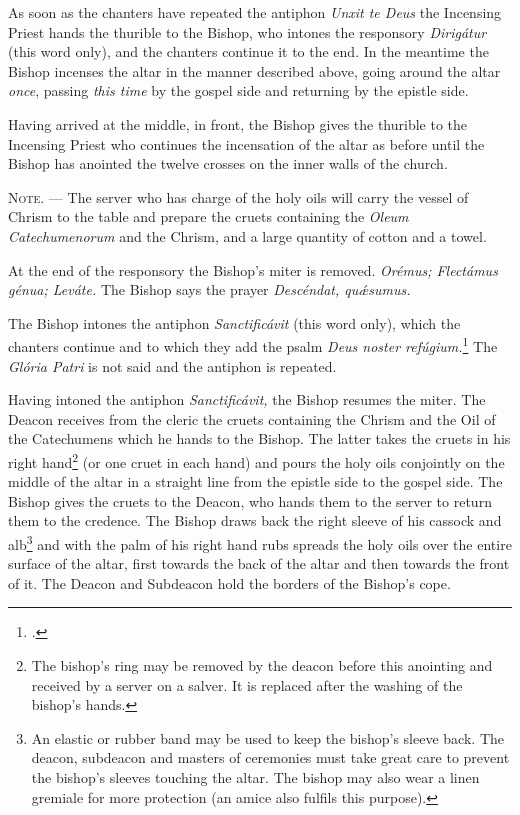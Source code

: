 \documentclass[letterpaper]{report}
\begin{document}
{    As soon as the chanters have repeated the antiphon \textit{Unxit te Deus}
    the Incensing Priest hands the thurible to the Bishop, who intones the
    responsory \textit{Dirig\'atur} (this word only), and the chanters continue
    it to the end. In the meantime the Bishop incenses the altar in the manner
    described above, going around the altar \textit{once}, passing \textit{this
    time} by the gospel side and returning by the epistle side.

    \rubric Having arrived at the middle, in front, the Bishop gives the
    thurible to the Incensing Priest who continues the incensation of the altar
    as before until the Bishop has anointed the twelve crosses on the inner
    walls of the church.

    \textsc{Note. ---} The server who has charge of the holy oils will carry
    the vessel of Chrism to the table and prepare the cruets containing the
    \textit{Oleum Catechumenorum} and the Chrism, and a large
    quantity of cotton and a towel.

    \rubric At the end of the responsory the Bishop's miter is removed.
    \textit{Orémus; Flectámus génua; Leváte.} The Bishop says the prayer
    \textit{Descéndat, qu\'\ae sumus.}

    \rubric The Bishop intones the antiphon \textit{Sanctificávit} (this word
    only), which the chanters continue and to which they add the psalm
    \textit{Deus noster refúgium.}\footcite[The antiphon \textit{Sanctificávit
    Dóminus} may be repeated after each verse of this psalm.][footnote 1, p.
    108.]{consecranda} The \textit{Glória Patri} is not said and the antiphon
    is repeated.

    \rubric Having intoned the antiphon \textit{Sanctificávit,} the Bishop
    resumes the miter. The Deacon receives from the cleric the cruets
    containing the Chrism and the Oil of the Catechumens which he hands to the
    Bishop. The latter takes the cruets in his right hand\footnote{The bishop's
    ring may be removed by the deacon before this anointing and received by a
    server on a salver. It is replaced after the washing of the bishop's
    hands.} (or one cruet in each hand) and pours the holy oils conjointly on
    the middle of the altar in a straight line from the epistle side to the
    gospel side. The Bishop gives the cruets to the Deacon, who hands them to
    the server to return them to the credence. The Bishop draws back the right
    sleeve of his cassock and alb\footnote{An elastic or rubber band may be
    used to keep the bishop's sleeve back. The deacon, subdeacon and masters of
    ceremonies must take great care to prevent the bishop's sleeves touching
    the altar. The bishop may also wear a linen gremiale for more protection
    (an amice also fulfils this purpose).} and with the palm of his right hand
    rubs spreads the holy oils over the entire surface of the altar, first
    towards the back of the altar and then towards the front of it. The Deacon
    and Subdeacon hold the borders of the Bishop's cope.

}
\end{document}
